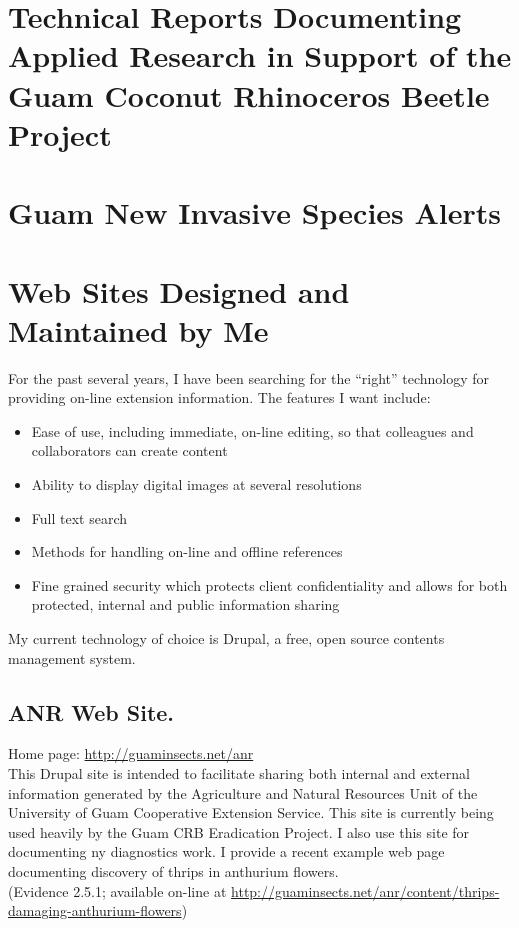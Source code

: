 \documentclass[12pt,oneside,english]{scrbook}
\begin{document}
\begingroup
\let\clearpage\relax
\printbibliography[heading=none,	keyword=cfes2015, keyword=presentation]
\endgroup

\section{Technical Reports Documenting Applied Research in Support of the
Guam Coconut Rhinoceros Beetle Project}

\begingroup
\let\clearpage\relax
\printbibliography[heading=none,	keyword=cfes2015, keyword=crbtechreport]
\endgroup

\section{Guam New Invasive Species Alerts} 
\label{Guam New Invasive Species Alerts}

\begingroup
\let\clearpage\relax
\printbibliography[heading=none,	keyword=cfes2015, keyword=gisa]
\endgroup

\section{\label{sec:Web-Sites-Designed}Web Sites Designed and Maintained by Me}

For the past several years, I have been searching for the ``right''
technology for providing on-line extension information. The features
I want include:
\begin{itemize}
\item Ease of use, including immediate, on-line editing, so that colleagues
and collaborators can create content
\item Ability to display digital images at several resolutions
\item Full text search
\item Methods for handling on-line and offline references
\item Fine grained security which protects client confidentiality and allows
for both protected, internal and public information sharing
\end{itemize}
My current technology of choice is Drupal, a free, open source contents
management system. 

\subsection{ANR Web Site.}

Home page: \url{http://guaminsects.net/anr}\\
This Drupal site is intended to facilitate sharing both internal and
external information generated by the Agriculture and Natural Resources
Unit of the University of Guam Cooperative Extension Service. This
site is currently being used heavily by the Guam CRB Eradication Project.
I also use this site for documenting ny diagnostics work. I provide
a recent example web page documenting discovery of thrips in anthurium
flowers. \\
(Evidence 2.5.1; available on-line at \url{http://guaminsects.net/anr/content/thrips-damaging-anthurium-flowers})
\end{document}
